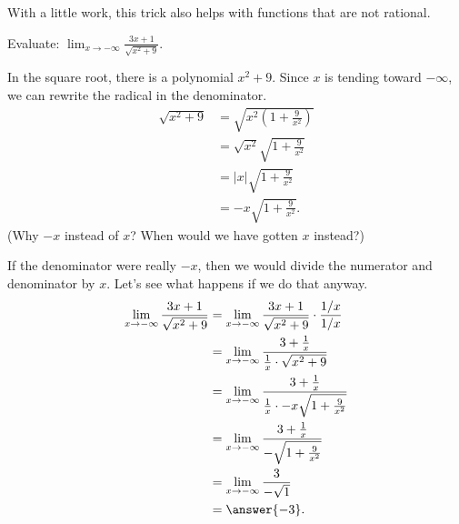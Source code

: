 \documentclass{ximera}
\begin{document}
With a little work, this trick also helps with functions that are not rational.
\begin{example}
	Evaluate: $\displaystyle \lim_{x\to -\infty} \frac{3x+1}{\sqrt{x^2+9}}$.
	\begin{explanation}
		In the square root, there is a polynomial $x^2+9$.  Since $x$ is tending toward $-\infty$, we can rewrite the radical in the denominator.  
		\begin{align*}
			\sqrt{x^2+9} &= \sqrt{x^2\left(1 + \frac{9}{x^2} \right)}\\
				&= \sqrt{x^2} \sqrt{1+\frac{9}{x^2}}\\
				&= |x| \sqrt{1+\frac{9}{x^2}}\\
				&= -x \sqrt{1+\frac{9}{x^2} }.
		\end{align*}
		(Why $-x$ instead of $x$?  When would we have gotten $x$ instead?)

		If the denominator were really $-x$, then we would divide the numerator and denominator by $x$.  Let's see what happens if we do that anyway.
		\begin{align*}
			\lim_{x\to -\infty} \frac{3x+1}{\sqrt{x^2+9}} &= \lim_{x\to -\infty} \frac{3x+1}{\sqrt{x^2+9}} \cdot \frac{1/x}{1/x}\\
				&= \lim_{x\to -\infty} \frac{3+\frac{1}{x}}{\frac{1}{x} \cdot \sqrt{x^2+9}} \\
				&= \lim_{x\to -\infty} \frac{3+\frac{1}{x}}{\frac{1}{x} \cdot -x \sqrt{1 + \frac{9}{x^2}}} \\
				&= \lim_{x\to -\infty} \frac{3+\frac{1}{x}}{ - \sqrt{1 + \frac{9}{x^2}}} \\
				&= \lim_{x\to -\infty} \frac{3}{-\sqrt{1}}\\
				&= \answer{-3}.
		\end{align*}
	\end{explanation}
\end{example}
\end{document}
